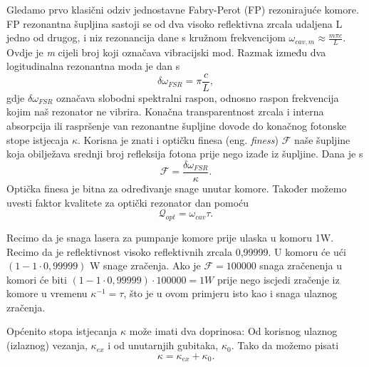 
Gledamo prvo klasični odziv jednostavne Fabry-Perot (FP) rezonirajuće komore. FP rezonantna šupljina sastoji se od dva visoko reflektivna
zrcala udaljena L jedno od drugog, i niz rezonancija dane s kružnom frekvencijom $\omega_{cav,m} \approx \frac{m\pi c}{L}$. Ovdje je \textit{m} cijeli broj koji označava
vibracijski mod. Razmak između dva logitudinalna rezonantna moda je dan s
\begin{equation}
	\delta\omega_{FSR} = \pi \frac{c}{L},
\end{equation}
gdje $\delta \omega_{FSR}$ označava slobodni spektralni raspon, odnosno raspon frekvencija kojim naš rezonator ne vibrira. Konačna transparentnost zrcala i
interna absorpcija ili raspršenje van rezonantne šupljine dovode do konačnog fotonske stope istjecaja $\kappa$.
Korisna je znati i optičku finesa (eng. \textit{finess}) $\mathcal{F}$ naše šupljine koja obilježava srednji broj refleksija fotona prije nego izađe iz šupljine. Dana je s
\begin{equation}
	\mathcal{F} = \frac{\delta\omega_{FSR}}{\kappa}.
\end{equation}
Optička finesa je bitna za određivanje snage unutar komore. Također možemo uvesti faktor kvalitete za optički rezonator dan pomoću
\begin{equation}
	\mathcal{Q}_{opt} = \omega_{cav} \tau.
\end{equation}
\begin{Bilješka}
Recimo da je snaga lasera za pumpanje komore prije ulaska u komoru 1W. Recimo da je reflektivnost visoko reflektivnih zrcala 0,99999.
U komoru će ući $\left(1-1\cdot0,99999\right)$ W snage zračenja. Ako je $\mathcal{F}=100000$ snaga zračenenja u komori će biti
$\left(1-1\cdot0,99999\right)\cdot 100000 = 1W$ prije nego iscjedi zračenje iz komore u vremenu $\kappa^{-1} = \tau$, što je u ovom primjeru isto kao i snaga ulaznog zračenja.
\end{Bilješka}
Općenito stopa istjecanja $\kappa$ može imati dva doprinosa: Od korisnog ulaznog (izlaznog) vezanja, $\kappa_{ex}$ i od unutarnjih gubitaka, $\kappa_0$. Tako da možemo pisati
\begin{equation}
	\kappa = \kappa_{ex} + \kappa_0.
\end{equation}

